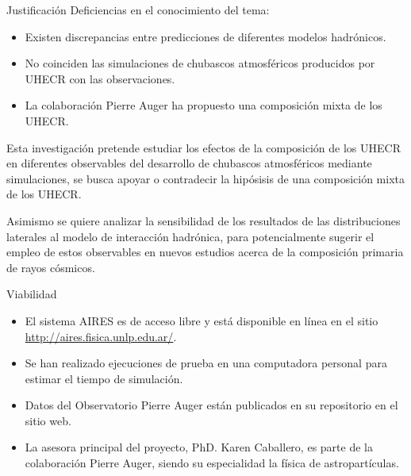 \documentclass[10pt]{beamer}
\begin{document}
\begin{frame}{Justificación}
Deficiencias en el conocimiento del tema: \vspace{0.5 cm}
\begin{itemize}
\item Existen discrepancias entre predicciones de diferentes modelos hadrónicos. \vspace{0.5 cm}
\item No coinciden las simulaciones de chubascos atmosféricos producidos por UHECR con las observaciones. \vspace{0.5 cm}
\item La colaboración Pierre Auger ha propuesto una composición mixta de los UHECR.
\end{itemize}
\end{frame}

\begin{frame}

Esta investigación pretende estudiar los efectos de la composición de los UHECR en diferentes observables del desarrollo de chubascos atmosféricos mediante simulaciones, se busca apoyar o contradecir la hipósisis de una composición mixta de los UHECR. \\ \vspace{0.6 cm}

Asimismo se quiere analizar la sensibilidad de los resultados de las distribuciones laterales al modelo de interacción hadrónica, para potencialmente sugerir el empleo de estos observables en nuevos estudios acerca de la composición primaria de rayos cósmicos.
\end{frame}

\begin{frame}{Viabilidad}
\begin{itemize}
\item El sistema AIRES es de acceso libre y está disponible en línea en el sitio \url{http://aires.fisica.unlp.edu.ar/}. \vspace{0.5 cm}
\item Se han realizado ejecuciones de prueba en una computadora personal para estimar el tiempo de simulación. \vspace{0.5 cm}
\item Datos del Observatorio Pierre Auger están publicados en su repositorio en el sitio web. \vspace{0.5 cm}
\item La asesora principal del proyecto, PhD. Karen Caballero, es parte de la colaboración Pierre Auger, siendo su especialidad la física de astropartículas.
\end{itemize}

\end{frame}
\end{document}
